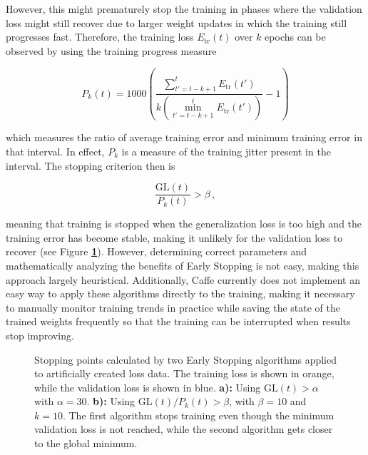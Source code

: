 However, this might prematurely stop the training in phases where the validation loss might still recover due to larger weight updates in which the training still progresses fast. Therefore, the training loss $E_{\text{tr}}(t)$ over $k$ epochs can be observed by using the training progress measure

\[ P_k(t) = 1000 \left ( \frac{\sum_{t' = t - k + 1}^{t} E_{\text{tr}}(t')}{k (\min_{t' = t - k + 1}^{t} E_{\text{tr}}(t'))} - 1 \right ) \]

\noindent which measures the ratio of average training error and minimum training error in that interval. In effect, $P_k$ is a measure of the training jitter present in the interval. The stopping criterion then is 

\[ \frac{\text{GL}(t)}{P_k(t)} > \beta \,, \]

\noindent meaning that training is stopped when the generalization loss is too high and the training error has become stable, making it unlikely for the validation loss to recover (see Figure \textbf{\ref{fig:early_stopping}}). However, determining correct parameters and mathematically analyzing the benefits of Early Stopping is not easy, making this approach largely heuristical. Additionally, Caffe currently does not implement an easy way to apply these algorithms directly to the training, making it necessary to manually monitor training trends in practice while saving the state of the trained weights frequently so that the training can be interrupted when results stop improving.


\begin {figure}[!ht]
	\begin{center}
		\scalebox{0.7}{}
	\end{center}
	\caption[Early stopping.]{Stopping points calculated by two Early Stopping algorithms applied to artificially created loss data. The training loss is shown in orange, while the validation loss is shown in blue. \textbf{a):} Using $\text{GL}(t) > \alpha$ with $\alpha = 30$. \textbf{b):} Using $\text{GL}(t)/P_k(t) > \beta$, with $\beta = 10$ and $k = 10$. The first algorithm stops training even though the minimum validation loss is not reached, while the second algorithm gets closer to the global minimum. }
	\label{fig:early_stopping}
\end {figure}


